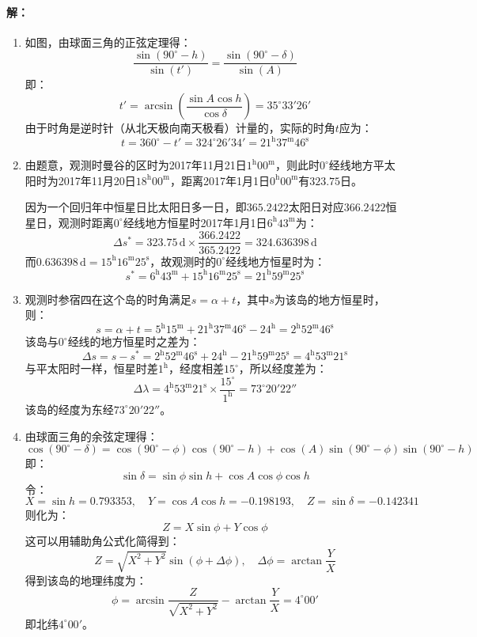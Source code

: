 \documentclass[a4paper]{article}
\begin{document}
\paragraph{解：}
\begin{enumerate}
    \item[(a)]
    如图，由球面三角的正弦定理得：
    \[
        \frac{\sin(90^\circ - h)}{\sin(t')} = \frac{\sin(90^\circ - \delta)}{\sin(A)}
    \]
    即：
    \[
        t' = \arcsin\left(\frac{\sin A\cos h}{\cos\delta}\right) = 35^\circ33'26'
    \]
    由于时角是逆时针（从北天极向南天极看）计量的，实际的时角$t$应为：
    \[
        t = 360^\circ - t' = 324^\circ26'34' = \mathrm{21^h37^m46^s}
    \]

    \item[(b)]
    由题意，观测时曼谷的区时为2017年11月21日$\mathrm{1^h00^m}$，则此时$0^\circ$经线地方平太阳时为2017年11月20日$\mathrm{18^h00^m}$，距离2017年1月1日$\mathrm{0^h00^m}$有$323.75$日。

    因为一个回归年中恒星日比太阳日多一日，即$365.2422$太阳日对应$366.2422$恒星日，观测时距离$0^\circ$经线地方恒星时2017年1月1日$\mathrm{6^h43^m}$为：
    \[
        \Delta s^* = 323.75\,\mathrm{d} \times \frac{366.2422}{365.2422} = 324.636398\,\mathrm{d}
    \]
    而$0.636398\,\mathrm{d} = \mathrm{15^h16^m25^s}$，故观测时的$0^\circ$经线地方恒星时为：
    \[
        s^* = \mathrm{6^h43^m} + \mathrm{15^h16^m25^s} = \mathrm{21^h59^m25^s}
    \]

    \item[(c)]
    观测时参宿四在这个岛的时角满足$s = \alpha + t$，其中$s$为该岛的地方恒星时，则：
    \[
        s = \alpha + t = \mathrm{5^h15^m} + \mathrm{21^h37^m46^s} - \mathrm{24^h} = \mathrm{2^h52^m46^s}
    \]
    该岛与$0^\circ$经线的地方恒星时之差为：
    \[
        \Delta s = s - s^* = \mathrm{2^h52^m46^s} + \mathrm{24^h} - \mathrm{21^h59^m25^s} = \mathrm{4^h53^m21^s}
    \]
    与平太阳时一样，恒星时差$\mathrm{1^h}$，经度相差$15^\circ$，所以经度差为：
    \[
        \Delta\lambda = \mathrm{4^h53^m21^s} \times \frac{15^\circ}{\mathrm{1^h}} = 73^\circ20'22''
    \]
    该岛的经度为东经$73^\circ20'22''$。

    \item[(d)]
    由球面三角的余弦定理得：
    \[
        \cos(90^\circ - \delta) = \cos(90^\circ - \phi)\cos(90^\circ - h) + \cos(A)\sin(90^\circ - \phi)\sin(90^\circ - h)
    \]
    即：
    \[
        \sin\delta = \sin\phi\sin h + \cos A\cos\phi\cos h
    \]
    令：
    \[
        X=\sin h = 0.793353,\quad
        Y=\cos A\cos h = -0.198193,\quad
        Z = \sin\delta = -0.142341
    \]
    则化为：
    \[
        Z = X\sin\phi + Y\cos\phi
    \]
    这可以用辅助角公式化简得到：
    \[
        Z = \sqrt{X^2 + Y^2}\sin(\phi + \Delta\phi),\quad \Delta\phi = \arctan{\frac{Y}{X}}
    \]
    得到该岛的地理纬度为：
    \[
        \phi = \arcsin{\frac{Z}{\sqrt{X^2 + Y^2}}} - \arctan{\frac{Y}{X}} = \mathrm{4^\circ00'}
    \]
    即北纬$4^\circ00'$。
\end{enumerate}
\end{document}
